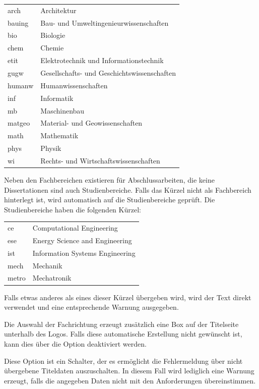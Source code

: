 \begin{description}
	\begin{tabular}{@{}l@{${}\to{}$}l@{}}
		arch  & Architektur\\
		bauing& Bau- und Umweltingenieurwissenschaften\\
		bio   &Biologie\\
		chem  &Chemie\\
		etit  &Elektrotechnik und Informationstechnik\\
		gugw  &Gesellschafts- und Geschichtswissenschaften\\
		humanw&Humanwissenschaften\\
		inf   &Informatik\\
		mb    &Maschinenbau\\
		matgeo&Material- und Geowissenschaften\\
		math  &Mathematik\\
		phys  &Physik\\
		wi    &Rechts- und Wirtschaftswissenschaften
	\end{tabular}

	Neben den Fachbereichen existieren für Abschlussarbeiten, die keine Dissertationen sind auch Studienbereiche.
	Falls das Kürzel nicht als Fachbereich hinterlegt ist, wird automatisch auf die Studienbereiche geprüft. Die Studienbereiche haben die folgenden Kürzel:

	\begin{tabular}{@{}l@{${}\to{}$}l@{}}
		ce&Computational Engineering\\
		ese&Energy Science and Engineering\\
		ist&Information Systems Engineering\\
		mech&Mechanik\\
		metro&Mechatronik
	\end{tabular}

	Falls etwas anderes als eines dieser Kürzel übergeben wird, wird der Text direkt verwendet und eine entsprechende Warnung ausgegeben.

	Die Auswahl der Fachrichtung erzeugt zusätzlich eine Box auf der Titelseite unterhalb des Logos. Falls diese automatische Erstellung nicht gewünscht ist, kann dies über die Option  deaktiviert werden.
\item[ignore-missing-data] Diese Option ist ein Schalter, der es ermöglicht die Fehlermeldung über nicht übergebene Titeldaten auszuschalten. In diesem Fall wird lediglich eine Warnung erzeugt, falls die angegeben Daten nicht mit den Anforderungen übereinstimmen.
\end{description}

